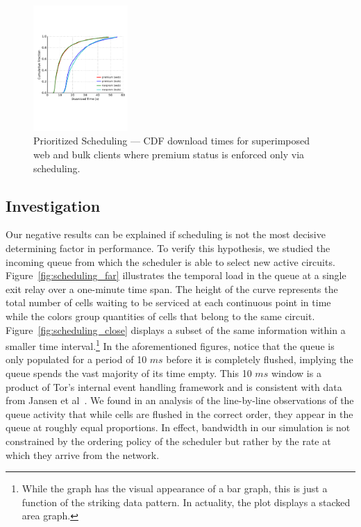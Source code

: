 \begin{figure} \centering
  \includegraphics[trim={0 3cm 0 3cm}, clip, width=0.32\textwidth]{images/scheduling_priority.pdf}
  \caption[Prioritized Scheduling]{Prioritized Scheduling --- CDF download
    times for superimposed web and bulk clients where premium status is enforced
    only via scheduling.}
  \label{fig:scheduling_priority}
\end{figure}

\subsection{Investigation}

Our negative results can be explained if scheduling is not the most decisive
determining factor in performance. To verify this hypothesis, we studied the
incoming queue from which the scheduler is able to select new active
circuits. Figure~\ref{fig:scheduling_far} illustrates the temporal load in the
queue at a single exit relay over a one-minute time span. The height of the
curve represents the total number of cells waiting to be serviced at each
continuous point in time while the colors group quantities of cells that belong
to the same circuit. Figure~\ref{fig:scheduling_close} displays a subset of the
same information within a smaller time interval.\footnote{While the graph has
  the visual appearance of a bar graph, this is just a function of the striking
  data pattern. In actuality, the plot displays a stacked area graph.} In the
aforementioned figures, notice that the queue is only populated for a period of
10 $ms$ before it is completely flushed, implying the queue spends the vast
majority of its time empty. This 10 $ms$ window is a product of Tor's internal
event handling framework and is consistent with data from Jansen et
al~\cite{jansen2017tor}. We found in an analysis of the line-by-line
observations of the queue activity that while cells are flushed in the correct
order, they appear in the queue at roughly equal proportions. In effect,
bandwidth in our simulation is not constrained by the ordering policy of the
scheduler but rather by the rate at which they arrive from the network.

